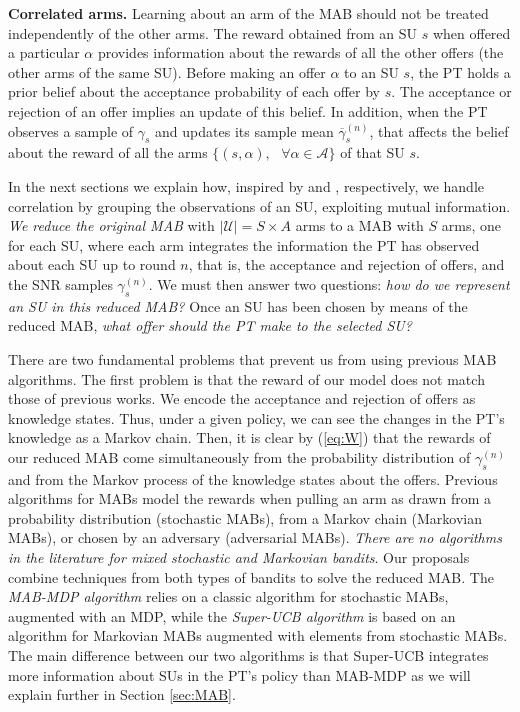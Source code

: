 \textbf{Correlated arms.} Learning about an arm of the MAB should not be treated independently of the other arms. The reward obtained from an SU $s$ when offered a particular $\alpha$ provides information about the rewards of all the other offers (the other arms of the same SU). Before making an offer $\alpha$ to an SU $s$, the PT holds a prior belief about the acceptance probability of each offer by $s$.  The acceptance or rejection of an offer implies an update of this belief. In addition, when the PT observes a sample of $\gamma_s$ and updates its sample mean $\overline\gamma_s^{(n)}$, that affects the belief about the reward of all the arms $\{(s,\alpha),\text{ } \forall \alpha \in \mathcal{A}\}$ of that SU $s$.

In the next sections we explain how, inspired by \cite{ref:Pandey2007} and \cite{ref:Brown2013}, respectively, we handle correlation by grouping the observations of an SU, exploiting mutual information. 
\textit{We reduce the original MAB} with $|\mathcal{U}| = S \times A$ arms to a MAB with $S$ arms, one for each SU, where each arm integrates the information the PT has observed about each SU up to round $n$, that is, the acceptance and rejection of offers, and the SNR samples $\gamma_s^{(n)}$. We must then answer two questions: \textit{how do we represent an SU in this reduced MAB?} Once an SU has been chosen by means of the reduced MAB, \textit{what offer should the PT make to the selected SU?}

There are two fundamental problems that prevent us from using previous MAB algorithms. The first problem is that the reward of our model does not match those of previous works. We encode the acceptance and rejection of offers as knowledge states. Thus, under a given policy, we can see the changes in the PT's knowledge as a Markov chain. Then, it is clear by (\ref{eq:W}) that the rewards of our reduced MAB come simultaneously from the probability distribution of $\gamma_s^{(n)}$ and from the Markov process of the knowledge states about the offers. Previous algorithms for MABs model the rewards when pulling an arm as drawn from a probability distribution (stochastic MABs), from a Markov chain (Markovian MABs), or chosen by an adversary (adversarial MABs). \textit{There are no algorithms in the literature for mixed stochastic and Markovian bandits}. Our proposals combine techniques from both types of bandits to solve the reduced MAB. The \textit{MAB-MDP algorithm} relies on a classic algorithm for stochastic MABs, augmented with an MDP, while the \textit{Super-UCB algorithm} is based on an algorithm for Markovian MABs augmented with elements from stochastic MABs. The main difference between our two algorithms is that Super-UCB integrates more information about SUs in the PT's policy than MAB-MDP as we will explain further in Section \ref{sec:MAB}.

